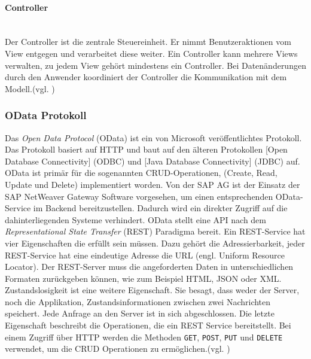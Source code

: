 \paragraph{Controller}$\;$ \\
Der Controller ist die zentrale Steuereinheit. Er nimmt Benutzeraktionen vom View entgegen und verarbeitet diese weiter. Ein Controller kann mehrere Views verwalten, zu jedem View gehört mindestens ein Controller. Bei Datenänderungen durch den Anwender koordiniert der Controller die Kommunikation mit dem Modell.(vgl. \cite[S.123f]{AntoEinf2014})

\subsubsection{OData Protokoll}
\glqq Das \textit{Open Data Protocol} (OData) ist ein von Microsoft veröffentlichtes Protokoll. Das Protokoll basiert auf HTTP und baut auf den älteren Protokollen [Open Database Connectivity] (ODBC) und [Java Database Connectivity] (JDBC) auf. OData ist primär für die sogenannten CRUD-Operationen, (Create, Read, Update und Delete) implementiert worden.\grqq{}\cite[S.168]{AntoEinf2014} Von der SAP AG ist der Einsatz der SAP NetWeaver Gateway Software vorgesehen, um einen entsprechenden OData-Service im Backend bereitzustellen. Dadurch wird ein direkter Zugriff auf die dahinterliegenden Systeme verhindert. OData stellt eine API nach dem \textit{Representational State Transfer} (REST) Paradigma bereit. Ein REST-Service hat vier Eigenschaften die erfüllt sein müssen. Dazu gehört die Adressierbarkeit, jeder REST-Service hat eine eindeutige Adresse die URL (engl. Uniform Resource Locator). Der REST-Server muss die angeforderten Daten in unterschiedlichen Formaten zurückgeben können, wie zum Beispiel HTML, JSON oder XML. Zustandslosigkeit ist eine weitere Eigenschaft. Sie besagt, dass weder der Server, noch die Applikation, Zustandsinformationen zwischen zwei Nachrichten speichert. Jede Anfrage an den Server ist in sich abgeschlossen. Die letzte Eigenschaft beschreibt die Operationen, die ein REST Service bereitstellt. Bei einem Zugriff über HTTP werden die Methoden \texttt{GET}, \texttt{POST}, \texttt{PUT} und \texttt{DELETE} verwendet, um die CRUD Operationen zu ermöglichen.(vgl. \cite{wikirest})

